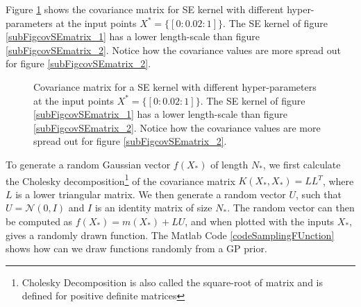 Figure \ref{figGPCovarianceMatrix} shows the covariance matrix for SE kernel with different hyper-parameters at the input points $X^{*} = \{[0:0.02:1]\}$. The SE kernel of figure \ref{subFigcovSEmatrix_1} has a lower length-scale than figure \ref{subFigcovSEmatrix_2}. Notice how the covariance values are more spread out for figure \ref{subFigcovSEmatrix_2}.

\begin{figure}[!ht]
  \centering
    \quad
{}\quad
  
       \caption{Covariance matrix for a SE kernel with different hyper-parameters at the input points $X^{*} = \{[0:0.02:1]\}$. The SE kernel of figure \ref{subFigcovSEmatrix_1} has a lower length-scale than figure \ref{subFigcovSEmatrix_2}. Notice how the covariance values are more spread out for figure \ref{subFigcovSEmatrix_2}.}\label{figGPCovarianceMatrix}
\end{figure}

To generate a random Gaussian vector $f(X_{*})$ of length $N_{*}$, we first calculate the Cholesky decomposition\footnote{Cholesky Decomposition is also called the square-root of matrix and is defined for positive definite matrices} of the covariance matrix $K(X_{*}, X_{*}) = LL^{T}$, where $L$ is a lower triangular matrix. We then generate a random vector $U$, such that $U = \mathcal{N}(0, I)$ and $I$ is an identity matrix of size $N_{*}$.  The random vector can then be computed as $f(X_{*}) = m(X_{*}) + LU$, and when plotted with the inputs $X_{*}$, gives a randomly drawn function. The Matlab Code \ref{codeSamplingFUnction} shows how can we draw functions randomly from a GP prior.

